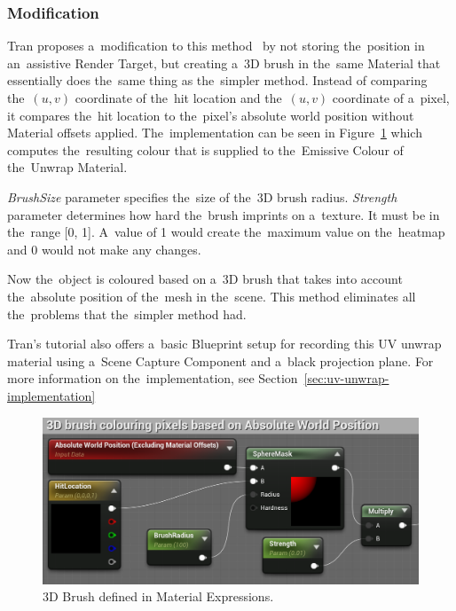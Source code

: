 \pagebreak{}
\subsubsection*{Modification}
Tran proposes a~modification to this method~\cite{tran2018wenderlich} by not storing the~position in an~assistive Render Target, but creating a~3D brush in the~same Material that essentially does the~same thing as the~simpler method. Instead of comparing the~$(u, v)$ coordinate of the~hit location and the~$(u, v)$ coordinate of a~pixel, it compares the~hit location to the~pixel's absolute world position without Material offsets applied. The~implementation can be seen in Figure~\ref{fig:unwrap-3d-brush} which computes the~resulting colour that is supplied to the~Emissive Colour of the~Unwrap Material.

\medskip{}
\emph{BrushSize} parameter specifies the~size of the~3D brush radius. \emph{Strength} parameter determines how hard the~brush imprints on a~texture. It must be in the~range [0, 1]. A~value of 1 would create the~maximum value on the~heatmap and 0 would not make any changes.

\medskip{}
Now the~object is coloured based on a~3D brush that takes into account the~absolute position of the~mesh in the~scene. This method eliminates all the~problems that the~simpler method had.

\medskip{}

Tran's tutorial also offers a~basic Blueprint setup for recording this UV unwrap material using a~Scene Capture Component and a~black projection plane. For more information on the~implementation, see Section~\ref{sec:uv-unwrap-implementation}

\begin{figure}[!ht]\centering
    \includegraphics[width=\textwidth]{img/unwrap-method-3d-brush.png}
    \caption{3D Brush defined in Material Expressions.}
    \label{fig:unwrap-3d-brush}
\end{figure}

